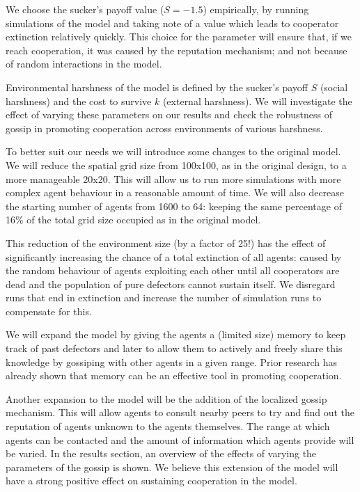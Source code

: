\documentclass[english]{article}
\begin{document}
We choose the sucker's payoff value ($S = -1.5$) empirically,
by running simulations of the model and taking note of a value which leads to cooperator extinction relatively quickly.
This choice for the parameter will ensure that, if we reach cooperation, it was caused by the reputation mechanism;
and not because of random interactions in the model.

Environmental harshness of the model is defined by
the sucker's payoff $S$ (social harshness) and
the cost to survive $k$ (external harshness).
We will investigate the effect of varying these parameters on our results
and check the robustness of gossip in promoting cooperation across environments of various harshness.

To better suit our needs we will introduce some changes to the original model.
We will reduce the spatial grid size from 100x100, as in the original design, to a more manageable 20x20.
This will allow us to run more simulations with more complex agent behaviour in a reasonable amount of time.
We will also decrease the starting number of agents from 1600 to 64: keeping the same percentage of 16\% of the total grid size occupied as in the original model.

This reduction of the environment size (by a factor of 25!) has the effect of significantly increasing the chance of a total extinction of all agents:
caused by the random behaviour of agents exploiting each other until all cooperators are dead and the population of pure defectors cannot sustain itself.
We disregard runs that end in extinction and increase the number of simulation runs to compensate for this.

We will expand the model by giving the agents a (limited size) memory to keep track of past defectors and later to allow them to actively and freely share this knowledge by gossiping with other agents in a given range.
Prior research \citep{memory, reciprocity, adaptive-interaction} has already shown that memory can be an effective tool in promoting cooperation.

Another expansion to the model will be the addition of the localized gossip mechanism.
This will allow agents to consult nearby peers to try and find out the reputation of agents unknown to the agents themselves.
The range at which agents can be contacted and the amount of information which agents provide will be varied.
In the results section, an overview of the effects of varying the parameters of the gossip is shown.
We believe this extension of the model will have a strong positive effect on sustaining cooperation in the model.
\end{document}
